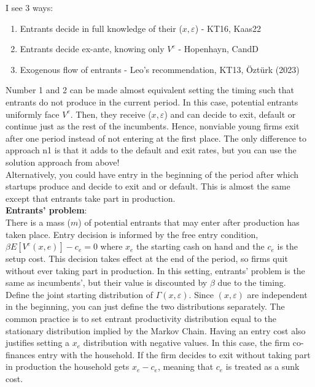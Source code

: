 \documentclass[12pt]{article}
\begin{document}
I see 3 ways:
\begin{enumerate} \setlength\itemsep{0em}
    \item Entrants decide in full knowledge of their ($x, \varepsilon$) - KT16, Kaas22
    \item Entrants decide ex-ante, knowing only $V^e$ - Hopenhayn, CandD
    \item Exogenous flow of entrants - Leo's recommendation, KT13, Öztürk (2023)
\end{enumerate}
Number 1 and 2 can be made almost equivalent setting the timing such that entrants do not produce in the current period. In this case, potential entrants uniformly face $V^e$. Then, they receive ($x, \varepsilon$) and can decide to exit, default or continue just as the rest of the incumbents. Hence, nonviable young firms exit after one period instead of not entering at the first place. The only difference to approach n1 is that it adds to the default and exit rates, but you can use the solution approach from above! \vspace{3mm} \\
Alternatively, you could have entry in the beginning of the period after which startups produce and decide to exit and or default. This is almost the same except that entrants take part in production. \vspace{3mm} \\
\textbf{Entrants' problem}: \\
There is a mass ($m$) of potential entrants that may enter after production has taken place. Entry decision is informed by the free entry condition, $\beta E[V^e(x,e)] - c_e = 0$ where $x_e$ the starting cash on hand and the $c_e$ is the setup cost. This decision takes effect at the end of the period, so firms quit without ever taking part in production. In this setting, entrants' problem is the same as incumbents', but their value is discounted by $\beta$ due to the timing. \vspace{3mm} \\
Define the joint starting distribution of $\Gamma(x,\varepsilon)$. Since $(x,\varepsilon)$ are independent in the beginning, you can just define the two distributions separately. The common practice is to set entrant productivity distribution equal to the stationary distribution implied by the Markov Chain. Having an entry cost also justifies setting a $x_e$ distribution with negative values. In this case, the firm co-finances entry with the household. If the firm decides to exit without taking part in production the household gets $x_e - c_e$, meaning that $c_e$ is treated as a sunk cost. \vspace{3mm} \\
\end{document}
